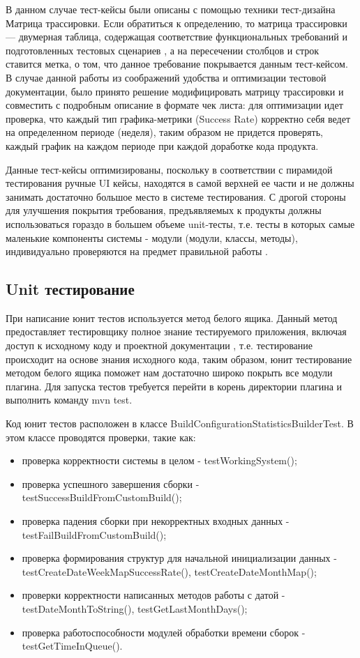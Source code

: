 В данном случае тест-кейсы были описаны с помощью техники тест-дизайна Матрица трассировки. Если обратиться к определению, то матрица трассировки — двумерная таблица, содержащая соответствие функциональных требований и подготовленных тестовых сценариев \cite{matrixtest}, а на пересечении столбцов и строк ставится метка, о том, что данное требование покрывается данным тест-кейсом. В случае данной работы из соображений удобства и оптимизации тестовой документации, было принято решение модифицировать матрицу трассировки и совместить с подробным описание в формате чек листа: для оптимизации идет проверка, что каждый тип графика-метрики (Success Rate) корректно себя ведет на определенном периоде (неделя), таким образом не придется проверять, каждый график на каждом периоде при каждой доработке кода продукта.

Данные тест-кейсы оптимизированы, поскольку в соответствии с пирамидой тестирования \cite{TestPyramid} ручные UI кейсы, находятся в самой верхней ее части и не должны занимать достаточно большое место в системе тестирования. С дрогой стороны для улучшения покрытия требования, предъявляемых к продукты должны использоваться гораздо в большем объеме unit-тесты, т.е. тесты в которых самые маленькие компоненты системы - модули (модули, классы, методы), индивидуально проверяются на предмет правильной работы \cite{unittest}.

\subsection{Unit тестирование}

При написание юнит тестов используется метод белого ящика. Данный метод предоставляет тестировщику полное знание тестируемого приложения, включая доступ к исходному коду и проектной документации \cite {whitebox}, т.е. тестирование происходит на основе знания исходного кода, таким образом, юнит тестирование методом белого ящика поможет нам достаточно широко покрыть все модули плагина. Для запуска тестов требуется перейти в корень директории плагина и выполнить команду mvn test.

Код юнит тестов расположен в классе BuildConfigurationStatisticsBuilderTest. В этом классе проводятся проверки, такие как:

\begin{itemize}
	\item проверка корректности системы в целом - testWorkingSystem();
	\item проверка успешного завершения сборки - testSuccessBuildFromCustomBuild();
	\item проверка падения сборки при некорректных входных данных - testFailBuildFromCustomBuild();
	\item проверка формирования структур для начальной инициализации данных - testCreateDateWeekMapSuccessRate(), testCreateDateMonthMap();
	\item проверки корректности написанных методов работы с датой - testDateMonthToString(), testGetLastMonthDays();
	\item проверка работоспособности модулей обработки времени сборок - testGetTimeInQueue().
\end{itemize}

